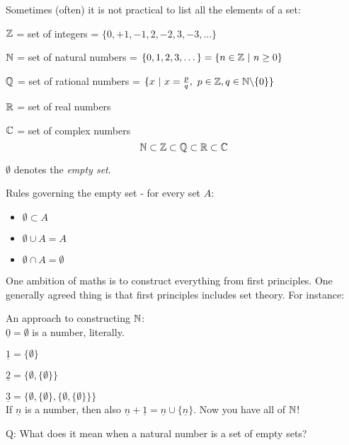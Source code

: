 \documentclass[twoside]{scrartcl}
\begin{document}
Sometimes (often) it is not practical to list all the elements of a set: 
\begin{examples}	\shortskip
\item $\mathbb{Z}$ = set of integers = $\{0, +1,-1,2,-2,3,-3,\dots\}$	
\item $\mathbb{N}$ = set of natural numbers = $\{0, 1, 2, 3,\dots\} = \{n \in \mathbb{Z} ~|~ n \geq 0\}$	
\item $\mathbb{Q}$ = set of rational numbers = $\{x ~|~ x = \frac{p}{q},~ p \in \mathbb{Z}, q \in \mathbb{N}\backslash\{0\} \}$	
\item $\mathbb{R}$ = set of real numbers 	
\item $\mathbb{C}$ = set of complex numbers
 \[\mathbb{N} \subset \mathbb{Z} \subset \mathbb{Q} \subset \mathbb{R} \subset \mathbb{C}\]
\end{examples}

$\emptyset$ 
 denotes the \emph{empty set}.

Rules governing the empty set - for every set $A$:\shortskip
\begin{itemize}
\shortskip
\item $\emptyset \subset A$
\item $\emptyset \cup A = A$ 
\item $\emptyset \cap A = \emptyset$
\end{itemize}\vspace*{5pt}

One ambition of maths is to construct everything from first principles. One generally agreed thing is that first principles includes set theory. For instance: \\

\begin{example}
An approach to constructing $\mathbb{N}$:\\

$\underline{0} = \emptyset$ is a number, literally. 

$\underline{1} = \{\emptyset\}$ 

$\underline{2} = \{\emptyset,\{\emptyset\}\}$

$\underline{3} = \{\emptyset,\{\emptyset\},\{\emptyset,\{\emptyset\}\}\}$ \\
	
If $\underline{n}$ is a number, then also $\underline{n} + \underline{1} = \underline{n} \cup \{\underline{n}\}$. Now you have all of $\mathbb{N}$!
\end{example}
\setlength{\parskip}{5pt}

Q: What does it mean when a natural number is a set of empty sets?
\end{document}
